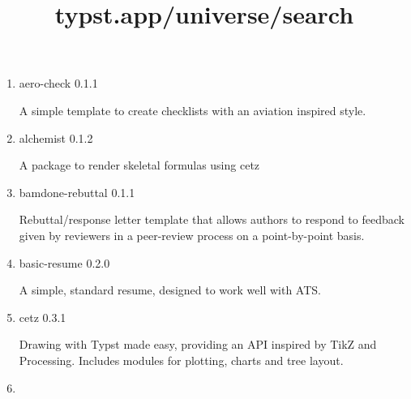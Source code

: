 \title{typst.app/universe/search}



\begin{enumerate}
\tightlist
\item
  \href{/universe/package/aero-check/}{}


  { aero-check } { 0.1.1 }

  A simple template to create checklists with an aviation inspired
  style.

  { }
\item
  \href{/universe/package/alchemist/}{}

  { alchemist } { 0.1.2 }

  A package to render skeletal formulas using cetz

  { }
\item
  \href{/universe/package/bamdone-rebuttal/}{}


  { bamdone-rebuttal } { 0.1.1 }

  Rebuttal/response letter template that allows authors to respond to
  feedback given by reviewers in a peer-review process on a
  point-by-point basis.

  { }
\item
  \href{/universe/package/basic-resume/}{}


  { basic-resume } { 0.2.0 }

  A simple, standard resume, designed to work well with ATS.

  { }
\item
  \href{/universe/package/cetz/}{}

  { cetz } { 0.3.1 }

  Drawing with Typst made easy, providing an API inspired by TikZ and
  Processing. Includes modules for plotting, charts and tree layout.

  { }
\item
  \href{/universe/package/charged-ieee/}{}


\end{enumerate}
